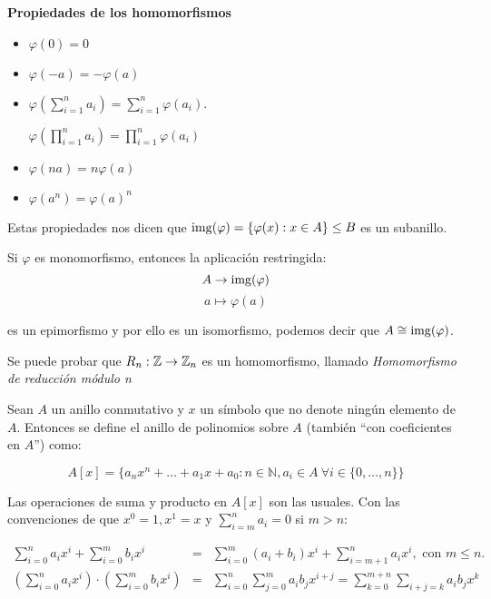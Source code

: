 \textbf{Propiedades de los homomorfismos}

\begin{itemize}

\item $\varphi(0) = 0$

\item $\varphi(-a) = -\varphi(a) $

\item $\varphi(\sum_{i = 1}^n a_i) = \sum_{i = 1}^n\varphi(a_i)$.

$\varphi(\prod_{i = 1}^n a_i) = \prod_{i = 1}^n\varphi(a_i)$

\item $\varphi(na) = n\varphi(a)$

\item $\varphi(a^n) = \varphi(a)^n$

\end{itemize}


Estas propiedades nos dicen que $\operatorname*{img}(\varphi) = \{ \varphi(x): x \in A\} \leq B$ es un subanillo.

\begin{nprop}
	Si $\varphi$ es monomorfismo, entonces la aplicación restringida:
\[
A \to \operatorname*{img}(\varphi)\]
\[
a \mapsto \varphi(a)
\]

es un epimorfismo y por ello es un isomorfismo, podemos decir que $A \cong \operatorname*{img}(\varphi)$.\\
\end{nprop}


\begin{nota}
	Se puede probar que $R_n: \mathbb{Z} \to \mathbb{Z}_n$ es un homomorfismo, llamado \emph{Homomorfismo de reducción módulo n}\\
\end{nota}

\begin{ndef}
  Sean $A$ un anillo conmutativo y $x$ un símbolo que no denote ningún elemento de $A$. Entonces se define el anillo de polinomios sobre $A$ (también ``con coeficientes en $A$'') como:

  \[
       A[x] = \{ a_nx^n + \dots + a_1x + a_0 : n \in \mathbb{N}, a_i \in A \ \forall i \in \{0, \dots, n\} \}
  \]

  Las operaciones de suma y producto en $A[x]$ son las usuales. Con las convenciones de que $x^0 = 1, x^1 = x$ y $\sum_{i=m}^n a_i = 0$ si $m>n$:

  \[
  \begin{array}{lllll}
    \sum_{i=0}^n a_ix^i + \sum_{i=0}^m b_ix^i & = & \sum_{i=0}^m (a_i + b_i)x^i + \sum_{i=m+1}^n a_ix^i, \text{ con $m \le n$.} & & \\
    \left(\sum_{i=0}^n a_ix^i\right) \cdot \left(\sum_{i=0}^m b_ix^i\right) & = & \sum_{i=0}^n \sum_{j=0}^m a_i b_j x^{i+j} =  \sum_{k=0}^{m+n} \sum_{i+j=k} a_ib_j x^k
  \end{array}
  \]

\end{ndef}

